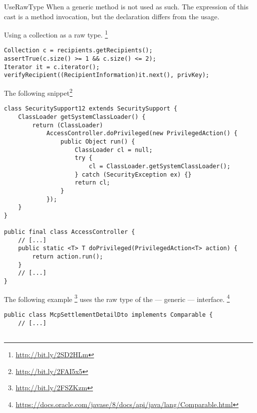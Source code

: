 \begin{pattern}{UseRawType}
When a generic method is not used as such.
The expression of this cast is a method invocation,
but the declaration differs from the usage.

\instances{}

Using a collection as a raw type.
\footnote{\url{http://bit.ly/2SD2HLm}}

\begin{verbatim}
Collection c = recipients.getRecipients();
assertTrue(c.size() >= 1 && c.size() <= 2);
Iterator it = c.iterator();
verifyRecipient((RecipientInformation)it.next(), privKey);
\end{verbatim}

The following snippet\footnote{\url{http://bit.ly/2FAI5x5}}


\begin{verbatim}
class SecuritySupport12 extends SecuritySupport {
    ClassLoader getSystemClassLoader() {
        return (ClassLoader)
            AccessController.doPrivileged(new PrivilegedAction() {
                public Object run() {
                    ClassLoader cl = null;
                    try {
                        cl = ClassLoader.getSystemClassLoader();
                    } catch (SecurityException ex) {}
                    return cl;
                }
            });
    }
}

public final class AccessController {
    // [...]
    public static <T> T doPrivileged(PrivilegedAction<T> action) {
        return action.run();
    }
    // [...]
}
\end{verbatim}

The following example%
\footnote{\url{http://bit.ly/2FSZKzm}}
uses the raw type of the  --- generic --- interface.%
\footnote{\url{https://docs.oracle.com/javase/8/docs/api/java/lang/Comparable.html}}

\begin{verbatim}
public class McpSettlementDetailDto implements Comparable {
    // [...]


\end{verbatim}
\end{pattern}
